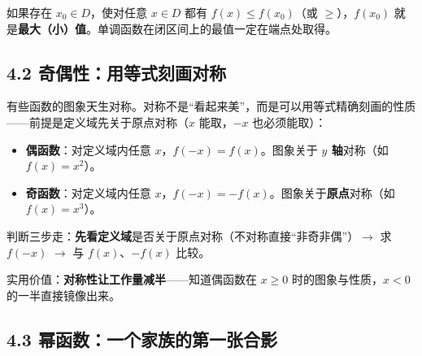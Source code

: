 \documentclass[UTF8,a4paper,11pt]{ctexart}
\begin{document}
如果存在 $x_0 \in D$，使对任意 $x \in D$ 都有 $f(x) \leq f(x_0)$（或 $\geq$），$f(x_0)$ 就是\textbf{最大（小）值}。单调函数在闭区间上的最值一定在端点处取得。

\subsection*{4.2 奇偶性：用等式刻画对称}

有些函数的图象天生对称。对称不是“看起来美”，而是可以用等式精确刻画的性质——前提是定义域先关于原点对称（$x$ 能取，$-x$ 也必须能取）：

\begin{keyconcept}[奇偶性的定义]
\begin{itemize}
  \item \textbf{偶函数}：对定义域内任意 $x$，$f(-x) = f(x)$。图象关于 \textbf{$y$ 轴}对称（如 $f(x)=x^2$）。
  \item \textbf{奇函数}：对定义域内任意 $x$，$f(-x) = -f(x)$。图象关于\textbf{原点}对称（如 $f(x)=x^3$）。
\end{itemize}
判断三步走：\textbf{先看定义域}是否关于原点对称（不对称直接“非奇非偶”）$\rightarrow$ 求 $f(-x)$ $\rightarrow$ 与 $f(x)$、$-f(x)$ 比较。
\end{keyconcept}

\begin{center}
\end{center}

实用价值：\textbf{对称性让工作量减半}——知道偶函数在 $x \geq 0$ 时的图象与性质，$x<0$ 的一半直接镜像出来。

\subsection*{4.3 幂函数：一个家族的第一张合影}
\end{document}
